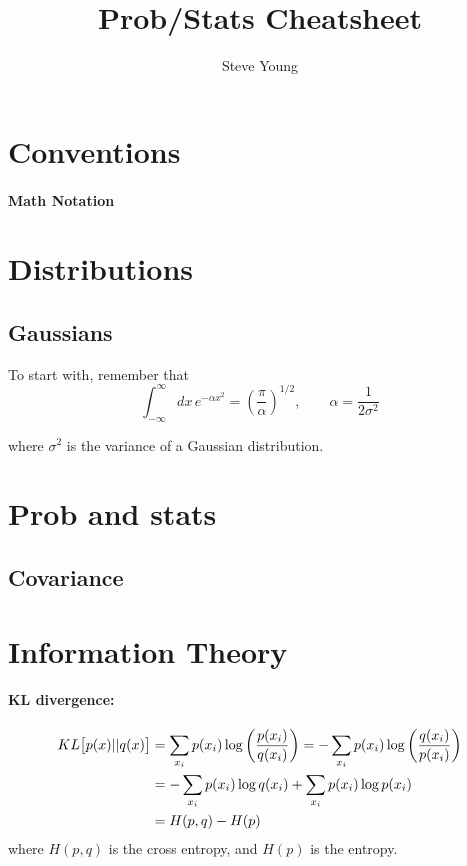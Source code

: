 \documentclass[11pt]{article}
\title{Prob/Stats Cheatsheet}
\author{Steve Young}
\begin{document}
\maketitle

\section{Conventions}
\paragraph{Math Notation}



\section{Distributions}
\subsection{Gaussians}
To start with, remember that
\begin{equation}
  \int_{-\infty}^{\infty} dx \, e^{-\alpha x^2} =
  \left(\frac{\pi}{\alpha}\right)^{1/2}, \qquad \alpha = \frac{1}{2 \sigma^2}
\end{equation}

\noindent where $\sigma^2$ is the variance of a Gaussian distribution.


\section{Prob and stats}
\subsection{Covariance}



\section{Information Theory}
\paragraph{KL divergence:}
\begin{align}
  KL\big[p(x) || q(x)\big] &= \sum_{x_i} p(x_i) \log\left(\frac{p(x_i)}{q(x_i)}
                             \right) = -\sum_{x_i} p(x_i)
                             \log\left(\frac{q(x_i)}{p(x_i)} \right) \nonumber\\
  &= -\sum_{x_i} p(x_i) \log q(x_i) + \sum_{x_i} p(x_i) \log p(x_i) \nonumber\\
  &= H(p,q) - H(p)
\end{align}
where $H(p,q)$ is the cross entropy, and $H(p)$ is the entropy.
\end{document}
